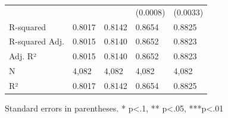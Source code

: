 \begin{table}
\begin{center}
\begin{tabular}{lllll}
                        &            &            & (0.0008)      & (0.0033)    \\
R-squared               & 0.8017     & 0.8142     & 0.8654        & 0.8825      \\
R-squared Adj.          & 0.8015     & 0.8140     & 0.8652        & 0.8823      \\
Adj. R²                 & 0.8015     & 0.8140     & 0.8652        & 0.8823      \\
N                       & 4,082      & 4,082      & 4,082         & 4,082       \\
R²                      & 0.8017     & 0.8142     & 0.8654        & 0.8825      \\
\hline
\end{tabular}
\end{center}
\end{table}
\bigskip
Standard errors in parentheses. \newline 
* p<.1, ** p<.05, ***p<.01